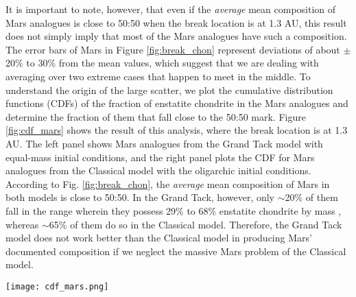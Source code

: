 \documentclass{aa}
\begin{document}
\begin{figure*}

\caption{The average percentage contribution of enstatite chondrite (red) and ordinary chondrite (blue) to the bulk compositions of Earth and Mars. Data are plotted as a function of the distance where the initial solid disk changes its composition from enstatite chondrite to ordinary chondrite, which is defined as the break location of the disk. The error bars are $\pm$1$\sigma$. The two upper panels depict the average composition of Earth and Mars in the Classical model simulations. The two lower panels show the results from Grand Tack simulations with equal-mass initial conditions, which is similar to Fig. 7 of \cite{brasser2017cool}.}    

\label{fig:break_chon}

\end{figure*}

It is important to note, however, that even if the \textit{average} mean composition of Mars analogues is close to 50:50 when the break location is at 1.3 AU, this result does not simply imply that most of the Mars analogues have such a composition. The error bars of Mars in Figure \ref{fig:break_chon} represent deviations of about $\pm$20\% to 30\% from the mean values, which suggest that we are dealing with averaging over two extreme cases that happen to meet in the middle. To understand the origin of the large scatter, we plot the cumulative distribution functions (CDFs) of the fraction of enstatite chondrite in the Mars analogues and determine the fraction of them that fall close to the 50:50 mark. Figure \ref{fig:cdf_mars} shows the result of this analysis, where the break location is at 1.3 AU. The left panel shows Mars analogues from the Grand Tack model with equal-mass initial conditions, and the right panel plots the CDF for Mars analogues from the Classical model with the oligarchic initial conditions. According to Fig. \ref{fig:break_chon}, the \textit{average} mean composition of Mars in both models is close to 50:50. In the Grand Tack, however, only $\sim$20\% of them fall in the range wherein they possess 29\% to 68\% enstatite chondrite by mass \citep{brasser2018GRL}, whereas $\sim$65\% of them do so in the Classical model. Therefore, the Grand Tack model does not work better than the Classical model in producing Mars’ documented composition if we neglect the massive Mars problem of the Classical model.

\begin{figure*}
\sidecaption
\texttt{[image: cdf\_mars.png]}
\caption{The cumulative distribution function of the Mars analogues’ final composition (percentage of enstatite chondrite incorporated into each planet) when the break location of the disk is 1.3 AU. The left panel shows results from the Grand Tack simulations with initial equal-mass embryos and the right panel is results from the Classical simulations with initial oligarchic embryos.}     

\label{fig:cdf_mars}

\end{figure*}
\end{document}
